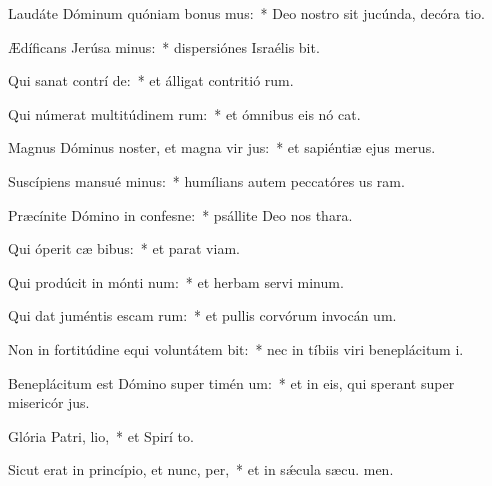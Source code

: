 \item Laudáte Dóminum quóniam bonus  mus:~* Deo nostro sit jucúnda, decóra tio.
\item Ædíficans Jerúsa minus:~* dispersiónes Israélis bit.
\item Qui sanat contrí de:~* et álligat contritió rum.
\item Qui númerat multitúdinem rum:~* et ómnibus eis nó cat.
\item Magnus Dóminus noster, et magna vir jus:~* et sapiéntiæ ejus   merus.
\item Suscípiens mansué minus:~* humílians autem peccatóres us  ram.
\item Præcínite Dómino in confesne:~* psállite Deo nos  thara.
\item Qui óperit cæ bibus:~* et parat  viam.
\item Qui prodúcit in mónti num:~* et herbam servi minum.
\item Qui dat juméntis escam rum:~* et pullis corvórum invocán um.
\item Non in fortitúdine equi voluntátem bit:~* nec in tíbiis viri beneplácitum  i.
\item Beneplácitum est Dómino super timén um:~* et in eis, qui sperant super misericór jus.
\item Glória Patri,  lio,~* et Spirí to.
\item Sicut erat in princípio, et nunc,  per,~* et in sǽcula sæcu. men.
